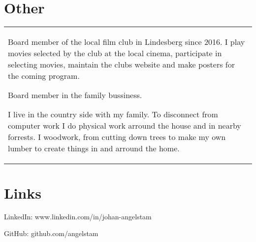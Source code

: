 \documentclass{cv-stylish}
\begin{document}
\begin{center}

\section{Other}

\begin{tabularx}{0.97\linewidth}{X}
Board member of the local film club in Lindesberg since 2016. I play
movies selected by the club at the local cinema, participate in
selecting movies, maintain the clubs website and make posters for the
coming program.

\vspace{10pt}

Board member in the family bussiness.

\vspace{10pt}

I live in the country side with my family. To disconnect from
computer work I do physical work arround the house and in nearby
forrests. I woodwork, from cutting down trees to make my own lumber to
create things in and arround the home.
\end{tabularx}



\section{Links}

LinkedIn: www.linkedin.com/in/johan-angelstam

GitHub: github.com/angelstam

\end{center}
\end{document}
